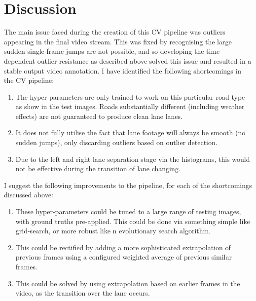 \documentclass[letterpaper,12pt]{article}
\begin{document}
\section{Discussion}
The main issue faced during the creation of this CV pipeline was outliers appearing in the final video stream. This was fixed by recognising the large sudden single frame jumps are not possible, and so developing the time dependent outlier resistance as described above solved this issue and resulted in a stable output video annotation. 
I have identified the following shortcomings in the CV pipeline:
\begin{enumerate}
\item The hyper parameters are only trained to work on this particular road type as show in the test images. Roads substantially different (including weather effects) are not guaranteed to produce clean lane lanes.
\item It does not fully utilise the fact that lane footage will always be smooth (no sudden jumps), only discarding outliers based on outlier detection.
\item Due to the left and right lane separation stage via the histograms, this would not be effective during the transition of lane changing.
\end{enumerate}
I suggest the following improvements to the pipeline, for each of the shortcomings discussed above:
\begin{enumerate}
\item These hyper-parameters could be tuned to a large range of testing images, with ground truths pre-applied. This could be done via something simple like grid-search, or more robust like n evolutionary search algorithm. 
\item This could be rectified by adding a more sophisticated extrapolation of previous frames using a configured weighted average of previous similar frames.
\item This could be solved by using extrapolation based on earlier frames in the video, as the transition over the lane occurs. 
\end{enumerate}
\end{document}
